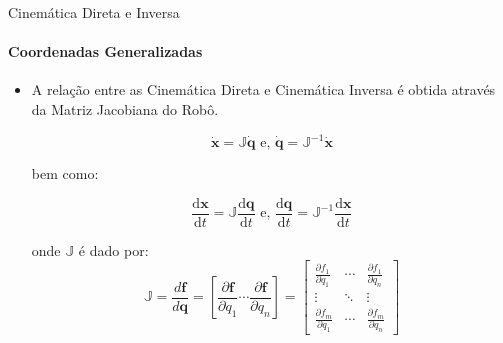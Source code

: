 \documentclass[aspectratio=169]{beamer}
\begin{document}
\begin{frame}{Cinemática Direta e Inversa}
    \framesubtitle{Coordenadas Generalizadas}
    \begin{itemize}
        \item A relação entre as Cinemática Direta e Cinemática Inversa é obtida através da Matriz Jacobiana do Robô.

              \begin{equation*}
                  \mathbf{\dot{x}} = \mathbb{J}{\mathbf{\dot{q}}}
                  \text{ e, }
                  \mathbf{\dot{q}} = \mathbb{J}^{-1}{\mathbf{\dot{x}}}
              \end{equation*}

              bem como:

              \begin{equation*}
                  \frac{\text{d}\mathbf{x}}{\text{d}t} = \mathbb{J}\frac{\text{d}\mathbf{q}}{\text{d}t}
                  \text{ e, }
                  \frac{\text{d}\mathbf{q}}{\text{d}t} = \mathbb{J}^{-1}\frac{\text{d}\mathbf{x}}{\text{d}t}
              \end{equation*}

              onde $\mathbb{J}$ é dado por:
              \begin{equation*}
                  \mathbb{J}
                  =
                  \frac{d \mathbf{f}}{d \mathbf{q}}
                  =
                  \left[ \frac{\partial \mathbf{f}}{\partial q_1}
                      \cdots \frac{\partial \mathbf{f}}{\partial q_n} \right]
                  =
                  \begin{bmatrix}
                      \frac{\partial f_1}{\partial q_1} & \cdots &
                      \frac{\partial f_1}{\partial q_n}                   \\
                      \vdots                            & \ddots & \vdots \\
                      \frac{\partial f_m}{\partial q_1} & \cdots &
                      \frac{\partial f_m}{\partial q_n}
                  \end{bmatrix}
              \end{equation*}
    \end{itemize}
\end{frame}
\end{document}
